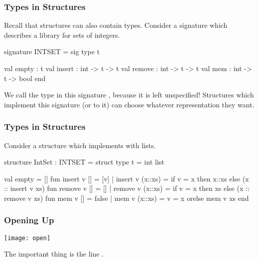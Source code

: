 \documentclass[aspectratio=169, handout]{beamer}
\begin{document}


\begin{frame}[fragile]
  \frametitle{Types in Structures}

  Recall that structures can also contain types. Consider a signature which
  describes a library for sets of integers.

  \pause
  \vspace{\fill}

  \begin{codeblock}
    signature INTSET =
      sig
        type t

        val empty : t
        val insert : int -> t -> t
        val remove : int -> t -> t
        val mem : int -> t -> bool
      end
  \end{codeblock}

  \pause
  \vspace{\fill}

  We call the type  in this signature , because it
  is left unspecified! Structures which implement this signature (or 
  to it) can choose whatever representation they want.
\end{frame}

\begin{frame}[fragile]
  \frametitle{Types in Structures}

  Consider a structure which implements  with lists.

  \pause
  \small
  \begin{codeblock}
    structure IntSet : INTSET =
      struct
        type t = int list

        val empty = []
        fun insert v [] = [v]
          | insert v (x::xs) =
              if v = x then x::xs
              else (x :: insert v xs)
        fun remove v [] = []
          | remove v (x::xs) =
              if v = x then xs
              else (x :: remove v xs)
        fun mem v [] = false
          | mem v (x::xs) = v = x orelse mem v xs
      end
  \end{codeblock}
\end{frame}

\begin{frame}[fragile]
  \frametitle{Opening Up}

  \begin{center}
    \texttt{[image: open]}
  \end{center}


  \pause
  \vspace{\fill}

  The important thing is the line .
\end{frame}
\end{document}
